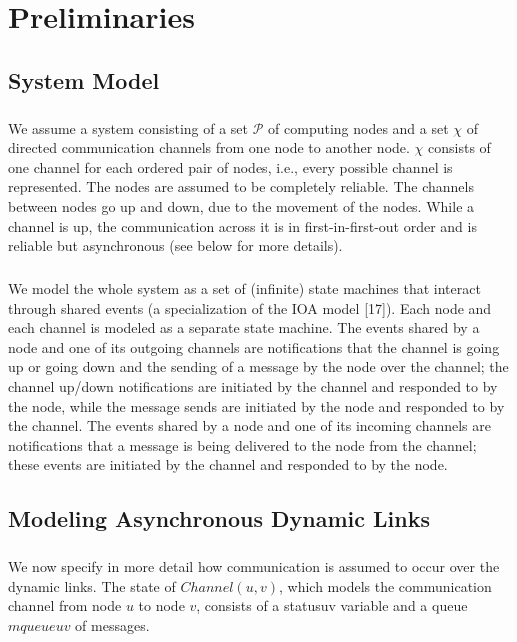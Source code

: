 \chapter{Preliminaries}
\section{System Model}
\paragraph{}We assume a system consisting of a set $\mathcal{P}$ of computing nodes and a set $\chi$ of directed communication channels from one node to another node. $\chi$ consists of one channel for each ordered pair of nodes, i.e., every possible channel is represented. The nodes are assumed to be completely reliable. The channels between nodes go up and down, due to the movement of the nodes. While a channel is up, the communication across it is in first-in-first-out order and is reliable but asynchronous (see below for more details).
\paragraph{}We model the whole system as a set of (infinite) state machines that interact through shared events (a specialization of the IOA model [17]). Each node and each channel is modeled as a separate state machine. The events shared by a node and one of its outgoing channels are notifications that the channel is going up or going down and the sending of a message by the node over the channel; the channel up/down notifications are initiated by the channel and responded to by the node, while the message sends are initiated by the node and responded to by the channel. The events shared by a node and one of its incoming channels are notifications that a message is being delivered to the node from the channel; these events are initiated by the channel and responded to by the node.
\newpage
\section{Modeling Asynchronous Dynamic Links}
\paragraph{}We now specify in more detail how communication is assumed to occur over the dynamic links. The state of $Channel(u, v)$, which models the communication channel from node $u$ to node $v$, consists of a statusuv variable and a queue $mqueueuv$ of messages.
